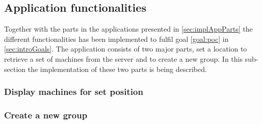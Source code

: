\subsection{Application functionalities}\label{sec:implAppPartsFunc}
Together with the parts in the applications presented in \cref{sec:implAppParts} the different functionalities has been implemented to fulfil goal \ref{goal:poc} in \cref{sec:introGoals}.
The application consists of two major parts, set a location to retrieve a set of machines from the server and to create a new group.
In this sub-section the implementation of these two parts is being described.

\subsubsection{Display machines for set position}\label{sec:implAppFuncMachines}
\subsubsection{Create a new group}\label{sec:implAppFuncGroup}

